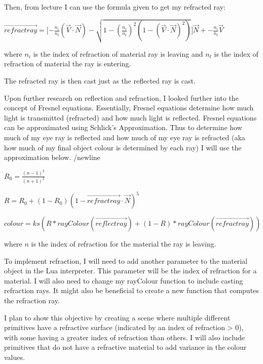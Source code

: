 \documentclass {article}
\begin{document}
\begin{description}
\begin{itemize}
	Then, from lecture I can use the formula given to get my refracted ray:\newline
	
	$\vec{refractray} = \lbrack -\frac{n_i}{n_t}(\vec{V}\cdot \vec{N}) - \sqrt{1 - (\frac{n_i}{n_t})^2 (1 - (\vec{V} \cdot \vec{N})^2)} \rbrack \vec{N} + -\frac{n_i}{n_t}\vec{V} $ \newline
	
	where $n_i$ is the index of refraction of material ray is leaving and $n_t$ is the index of refraction of material the ray is entering. \newline
	
	The refracted ray is then cast just as the reflected ray is cast.\newline
	
	Upon further research on reflection and refraction, I looked further into the concept of Fresnel equations. Essentially, Fresnel equations determine how much light is transmitted (refracted) and how much light is reflected. Fresnel equations can be approximated using Schlick's Approximation. Thus to determine how much of my eye ray is reflected and how much of my eye ray is refracted (aka how much of my final object colour is determined by each ray) I will use the approximation below. /newline
	
	$R_0 = \frac{(n - 1)^2}{(n + 1)^2}$
	
	$R = R_0 + (1 - R_0)(1 - \vec{refractray} \cdot \vec{N})^5$
	
	$colour = ks (R*rayColour(\vec{reflectray}) + (1-R)*rayColour(\vec{refractray}))$ \newline
	
	where $n$ is the index of refraction for the material the ray is leaving. \newline
	
	\cite{lectures_refl} \cite{blinn_newell} \cite{de_greve} \newline
	
	To implement refraction, I will need to add another parameter to the material object in the Lua interpreter. This parameter will be the index of refraction for a material. I will also need to change my rayColour function to include casting refraction rays. It might also be beneficial to create a new function that computes the refraction ray.\newline
	
	I plan to show this objective by creating a scene where multiple different primitives have a refractive surface (indicated by an index of refraction > 0), with some having a greater index of refraction than others. I will also include primitives that do not have a refractive material to add variance in the colour values. \newline
    	

\end{itemize}
\end{description}
\end{document}
